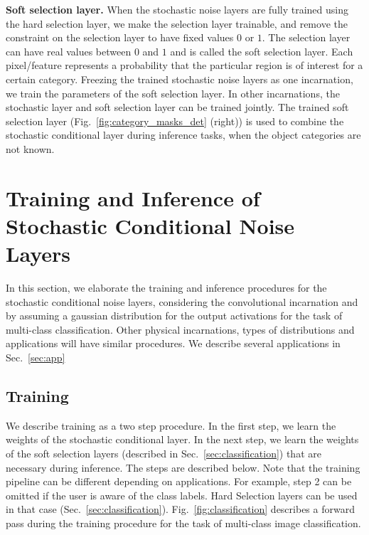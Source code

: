 \documentclass[12pt, letterpaper]{article}
\begin{document}
\noindent \textbf{Soft selection layer.} When the stochastic noise layers are fully trained using the hard selection layer, we make the selection layer trainable, and remove the constraint on the selection layer to have fixed values $0$ or $1$. The selection layer can have real values between $0$ and $1$ and is called the soft selection layer. Each pixel/feature represents a probability that the particular region is of interest for a certain category. Freezing the trained stochastic noise layers as one incarnation, we train the parameters of the soft selection layer. In other incarnations, the stochastic layer and soft selection layer can be trained jointly. The trained soft selection layer (Fig.~\ref{fig:category_masks_det} (right)) is used to combine the stochastic conditional layer during inference tasks, when the object categories are not known.

\section{Training and Inference of Stochastic Conditional Noise Layers}
\label{sec:training_inf}
 
In this section, we elaborate the training and inference procedures for the stochastic conditional noise layers, considering the convolutional incarnation and by assuming a gaussian distribution for the output activations for the task of multi-class classification. Other physical incarnations, types of distributions and applications will have similar procedures. We describe several applications in Sec.~\ref{sec:app}


\subsection{Training} 
We describe training as a two step procedure. In the first step, we learn the weights of the stochastic conditional layer. In the next step, we learn the weights of the soft selection layers (described in Sec.~\ref{sec:classification}) that are necessary during inference. The steps are described below. Note that the training pipeline can be different depending on applications. For example, step 2 can be omitted if the user is aware of the class labels. Hard Selection layers can be used in that case (Sec.~\ref{sec:classification}). Fig.~\ref{fig:classification} describes a forward pass during the training procedure for the task of multi-class image classification.
\end{document}
